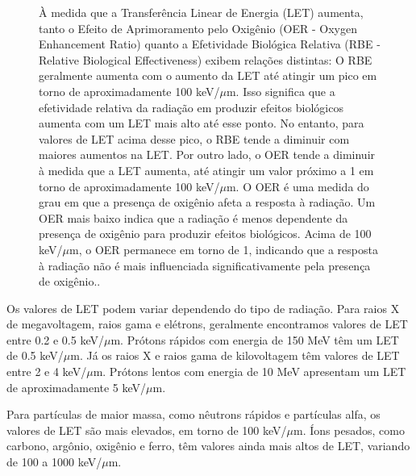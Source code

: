 \documentclass[11pt,a4paper]{article}
\begin{document}
	\begin{figure}[h]
		\centering
		\caption{À medida que a Transferência Linear de Energia (LET) aumenta, tanto o Efeito de Aprimoramento pelo Oxigênio (OER - Oxygen Enhancement Ratio) quanto a Efetividade Biológica Relativa (RBE - Relative Biological Effectiveness) exibem relações distintas: O RBE geralmente aumenta com o aumento da LET até atingir um pico em torno de aproximadamente 100 keV/$\mu$m. Isso significa que a efetividade relativa da radiação em produzir efeitos biológicos aumenta com um LET mais alto até esse ponto. No entanto, para valores de LET acima desse pico, o RBE tende a diminuir com maiores aumentos na LET. Por outro lado, o OER tende a diminuir à medida que a LET aumenta, até atingir um valor próximo a 1 em torno de aproximadamente 100 keV/$\mu$m. O OER é uma medida do grau em que a presença de oxigênio afeta a resposta à radiação. Um OER mais baixo indica que a radiação é menos dependente da presença de oxigênio para produzir efeitos biológicos. Acima de 100 keV/$\mu$m, o OER permanece em torno de 1, indicando que a resposta à radiação não é mais influenciada significativamente pela presença de oxigênio..}
		\label{fig:OerERbe}
	\end{figure}

	Os valores de LET podem variar dependendo do tipo de radiação. Para raios X de megavoltagem, raios gama e elétrons, geralmente encontramos valores de LET entre 0.2 e 0.5 keV/$\mu$m. Prótons rápidos com energia de 150 MeV têm um LET de 0.5 keV/$\mu$m. Já os raios X e raios gama de kilovoltagem têm valores de LET entre 2 e 4 keV/$\mu$m. Prótons lentos com energia de 10 MeV apresentam um LET de aproximadamente 5 keV/$\mu$m.

	Para partículas de maior massa, como nêutrons rápidos e partículas alfa, os valores de LET são mais elevados, em torno de 100 keV/$\mu$m. Íons pesados, como carbono, argônio, oxigênio e ferro, têm valores ainda mais altos de LET, variando de 100 a 1000 keV/$\mu$m.
\end{document}
